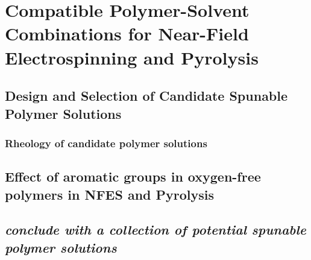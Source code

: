 
\chapter{Compatible Polymer-Solvent Combinations for Near-Field Electrospinning and Pyrolysis} %

\label{Chapter:4}

\section{Design and Selection of Candidate Spunable Polymer Solutions}



\subsection{Rheology of candidate polymer solutions}



\section{Effect of aromatic groups in oxygen-free polymers in NFES and Pyrolysis}



\section{\emph{conclude with a collection of potential spunable polymer solutions}}